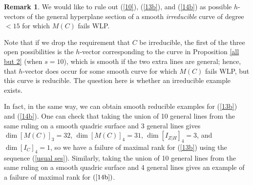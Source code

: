 \documentclass[12pt]{amsart}%
\numberwithin{equation}{section}
\theoremstyle{definition}
\newtheorem{remark}[theorem]{Remark}
\numberwithin{equation}{section}
\begin{document}
\begin{remark} \label{HU not enough}
We would like to rule out (\ref{10}), (\ref{13b}),  and (\ref{14b}) as possible $h$-vectors of the general hyperplane section of a smooth {\it irreducible} curve of degree $< 15$ for which $M(C)$ fails WLP. 

Note  that if we drop the requirement that $C$ be irreducible, the first of the three open possibilities is the $h$-vector corresponding to the curve in Proposition \ref{all but 2} (when $s=10$), which is smooth if the two extra lines are general; hence, that $h$-vector does occur for some smooth curve for which $M(C)$ fails WLP, but this curve is reducible. The question here is whether an irreducible example exists. 

In fact, in the same way, we can obtain smooth reducible examples for (\ref{13b})  and (\ref{14b}). One can check that taking the union of 10 general lines from the same ruling on a smooth quadric surface and 3 general lines gives $\dim [M(C)]_3 = 32$,  $\dim [M(C)]_4 = 31$, $\dim [I_{Z|H}]_4 = 3$, and $ \dim [I_C]_4 = 1$, so we have a failure of maximal rank for (\ref{13b}) using the sequence (\ref{usual ses}). Similarly, taking the union of 10 general lines from the same ruling on a smooth quadric surface and 4 general lines gives an example of a failure of maximal rank for $(\ref{14b})$.
\end{remark}
\end{document}
